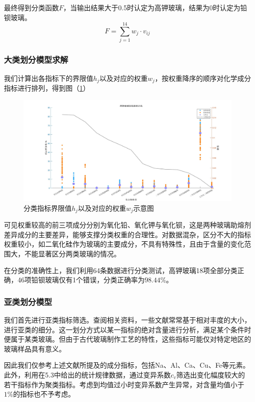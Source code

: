 \documentclass{my_paper}
\begin{document}
最终得到分类函数$ F $，当输出结果大于0.5时认定为高钾玻璃，结果为0时认定为铅钡玻璃。
\begin{equation}
F = \sum\limits_{j=1}^{14} w_j \cdot v_{ij}
\label{F}
\end{equation}

\subsubsection{大类划分模型求解}
我们计算出各指标下的界限值$ h_j $以及对应的权重$w_j$，按权重降序的顺序对化学成分指标进行排列，得到图（\ref{hjtu}）
\begin {figure}[h]
\centering %
\includegraphics[width=\textwidth]{6.jpg}
\caption{分类指标界限值$ h_j $以及对应的权重$w_j$示意图} %
\label{hjtu}
\end {figure}
\newpage

可见权重较高的前三项成分分别为氧化铅、氧化钾与氧化钡，这是两种玻璃助熔剂差异成分的主要差异，能够支撑分类权重的合理性。对数据混杂，区分不大的指标权重较小，如二氧化硅作为玻璃的主要成分，不具有特殊性，且由于含量的变化范围大，不能显著区分两类玻璃的情况。

在分类的准确性上，我们利用64条数据进行分类测试，高钾玻璃18项全部分类正确，46项铅钡玻璃仅有1个错误，分类正确率为$ 98.44\% $。

\subsubsection{亚类划分模型}
我们首先进行亚类指标筛选。查阅相关资料，一些文献\cite{8,9}常常基于相对丰度的大小，进行亚类的细分。这一划分方式以某一指标的绝对含量进行分析，满足某个条件时便属于某类玻璃。但由于古代玻璃制作工艺的特性，这些指标可能仅对特定地区的玻璃样品具有意义。

因此我们仅参考上述文献所提及的成分指标，包括Na、Al、Ca、Cu、Fe等元素。此外，利用在5.3中给出的统计规律数据，通过变异系数$c_v$筛选出变化幅度较大的若干指标作为聚类指标。考虑到均值过小时变异系数产生异常，对含量均值小于$1\%$的指标也不予考虑。
\end{document}
